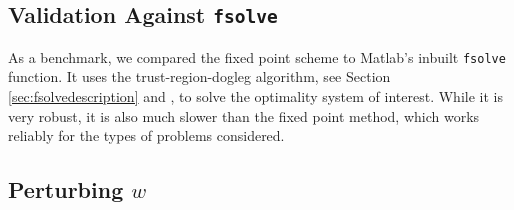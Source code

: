 \documentclass[11pt, a4paper]{article}
\theoremstyle{definition}
\begin{document}
\subsection{Validation Against \texttt{fsolve}}
As a benchmark, we compared the fixed point scheme to Matlab's inbuilt \texttt{fsolve} function. It uses the trust-region-dogleg algorithm, see Section \ref{sec:fsolvedescription} and \cite{Powell1}, to solve the optimality system of interest. While it is very robust, it is also much slower than the fixed point method, which works reliably for the types of problems considered. 


\subsection{Perturbing $w$}

\end{document}
